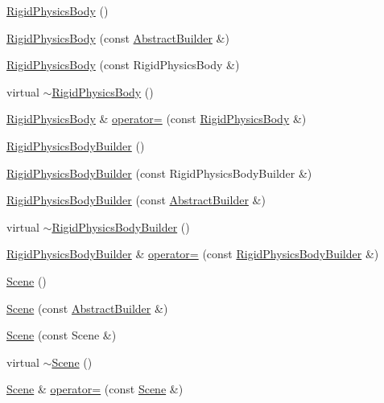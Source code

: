 \begin{DoxyCompactItemize}
\item 
\hyperlink{namespacejli_abfcfea11f23de653ae79e2386b20fcf7}{Rigid\+Physics\+Body} ()
\item 
\hyperlink{namespacejli_a596ae846781292f0e98d26c0dbe19e4b}{Rigid\+Physics\+Body} (const \hyperlink{classjli_1_1_abstract_builder}{Abstract\+Builder} \&)
\item 
\hyperlink{namespacejli_a1db8e1258954af5851434503b490ced3}{Rigid\+Physics\+Body} (const Rigid\+Physics\+Body \&)
\item 
virtual \hyperlink{namespacejli_ab7587778ba089865ae1eb092b0aab893}{$\sim$\+Rigid\+Physics\+Body} ()
\item 
\hyperlink{namespacejli_abfcfea11f23de653ae79e2386b20fcf7}{Rigid\+Physics\+Body} \& \hyperlink{namespacejli_a903a5b9b0a768e8c86aa7e02e2eedae9}{operator=} (const \hyperlink{namespacejli_abfcfea11f23de653ae79e2386b20fcf7}{Rigid\+Physics\+Body} \&)
\item 
\hyperlink{namespacejli_a35ab31f574578dc92892a216fbd584f3}{Rigid\+Physics\+Body\+Builder} ()
\item 
\hyperlink{namespacejli_a9814d7ddbfa20e170bd73122103e6310}{Rigid\+Physics\+Body\+Builder} (const Rigid\+Physics\+Body\+Builder \&)
\item 
\hyperlink{namespacejli_a6084d8cbe43a172a1b45970f839764eb}{Rigid\+Physics\+Body\+Builder} (const \hyperlink{classjli_1_1_abstract_builder}{Abstract\+Builder} \&)
\item 
virtual \hyperlink{namespacejli_aab9403c1b27dbf91f915e5788fb35871}{$\sim$\+Rigid\+Physics\+Body\+Builder} ()
\item 
\hyperlink{namespacejli_a35ab31f574578dc92892a216fbd584f3}{Rigid\+Physics\+Body\+Builder} \& \hyperlink{namespacejli_a1fa0b472eba06c9add10119cffa19d04}{operator=} (const \hyperlink{namespacejli_a35ab31f574578dc92892a216fbd584f3}{Rigid\+Physics\+Body\+Builder} \&)
\item 
\hyperlink{namespacejli_abef8701bc66efaecdfb9b759f7523e9d}{Scene} ()
\item 
\hyperlink{namespacejli_afbad74f1983633db64663db362041720}{Scene} (const \hyperlink{classjli_1_1_abstract_builder}{Abstract\+Builder} \&)
\item 
\hyperlink{namespacejli_a4e0a2f2e6f43f3cf5e866f662dfa011a}{Scene} (const Scene \&)
\item 
virtual \hyperlink{namespacejli_a59998f54275bafbf74434f6954f9cd2e}{$\sim$\+Scene} ()
\item 
\hyperlink{namespacejli_abef8701bc66efaecdfb9b759f7523e9d}{Scene} \& \hyperlink{namespacejli_a87277a99c7a713dc593e70bbab6bf0f8}{operator=} (const \hyperlink{namespacejli_abef8701bc66efaecdfb9b759f7523e9d}{Scene} \&)

\end{DoxyCompactItemize}
